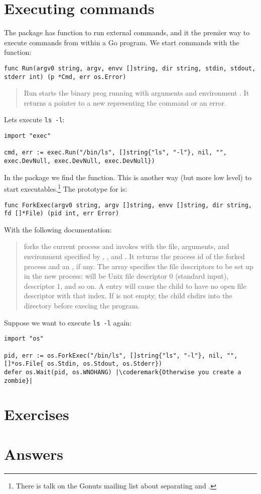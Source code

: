 \section{Executing commands}
The  package has function to run external commands, and it the premier way to
execute commands from within a Go program. We start commands with 
the  function:
\begin{lstlisting}
func Run(argv0 string, argv, envv []string, dir string, stdin, stdout, stderr int) (p *Cmd, err os.Error)
\end{lstlisting}
\begin{quote}
Run starts the binary prog running with
arguments  and environment .
It returns a pointer to a new  representing the command or an error.
\end{quote}
Lets execute \verb|ls -l|:
\begin{lstlisting}
import "exec"

cmd, err := exec.Run("/bin/ls", []string{"ls", "-l"}, nil, "", exec.DevNull, exec.DevNull, exec.DevNull})
\end{lstlisting}
In the  package we find the  function. This
is another way (but more low level) to start executables.\footnote{There is talk on
the Gonuts mailing list about separating  and
.} 
The prototype for  is:
\begin{lstlisting}
func ForkExec(argv0 string, argv []string, envv []string, dir string, fd []*File) (pid int, err Error)
\end{lstlisting}
With the following documentation:
\begin{quote}
 forks the current process and invokes  with the
file, arguments, and environment specified by , , and
. It returns the process id of the forked process and an
, if any. The  array specifies the file descriptors to be
set up in the new process:  will be Unix file descriptor 0 (standard
input),  descriptor 1, and so on.  A  entry will cause the
child to have no open file descriptor with that index.  If  is not
empty, the child chdirs into the directory before execing the program.
\end{quote}
Suppose we want to execute \verb|ls -l| again:
\begin{lstlisting}
import "os"

pid, err := os.ForkExec("/bin/ls", []string{"ls", "-l"}, nil, "", []*os.File{ os.Stdin, os.Stdout, os.Stderr})
defer os.Wait(pid, os.WNOHANG) |\coderemark{Otherwise you create a zombie}|
\end{lstlisting}


\section{Exercises}


\cleardoublepage
\section{Answers}
\shipoutAnswer
